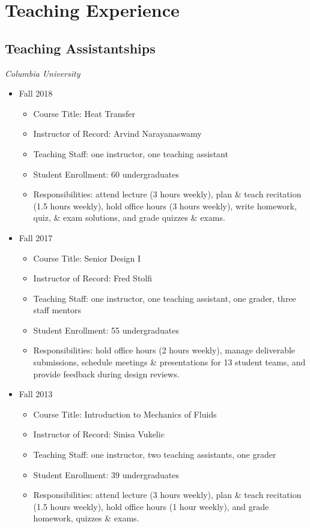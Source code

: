\pagestyle{plain}
\chapter[Teaching Experience][Teaching Experience]{Teaching Experience}

\section{Teaching Assistantships}

\textit{Columbia University} 
\begin{itemize}
\item Fall 2018
	\begin{itemize}
	\item Course Title: Heat Transfer
	\item Instructor of Record: Arvind Narayanaswamy
	\item Teaching Staff: one instructor, one teaching assistant
	\item Student Enrollment: 60 undergraduates
	\item Responsibilities: attend lecture (3 hours weekly), plan \& teach recitation (1.5 hours weekly), hold office hours (3 hours weekly), write homework, quiz, \& exam solutions, and grade quizzes \& exams. 
	\end{itemize}
\item Fall 2017
	\begin{itemize}
	\item Course Title: Senior Design I
	\item Instructor of Record: Fred Stolfi
	\item Teaching Staff: one instructor, one teaching assistant, one grader, three staff mentors
	\item Student Enrollment: 55 undergraduates
	\item Responsibilities: hold office hours (2 hours weekly), manage deliverable submissions, schedule meetings \& presentations for 13 student teams, and provide feedback during design reviews.
	\end{itemize}
\item Fall 2013
	\begin{itemize}
	\item Course Title: Introduction to Mechanics of Fluids
	\item Instructor of Record: Sinisa Vukelic
	\item Teaching Staff: one instructor, two teaching assistants, one grader
	\item Student Enrollment: 39 undergraduates
	\item Responsibilities: attend lecture (3 hours weekly), plan \& teach recitation (1.5 hours weekly), hold office hours (1 hour weekly), and grade homework, quizzes \& exams. 
	\end{itemize}
\end{itemize} 


